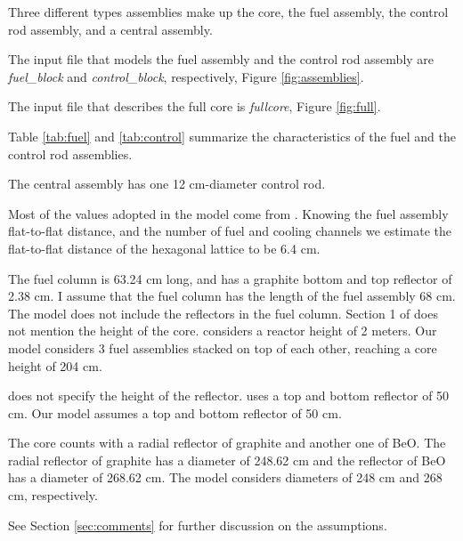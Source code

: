 \documentclass[11pt,letterpaper]{article}
\begin{document}
Three different types assemblies make up the core, the fuel assembly, the control rod assembly, and a central assembly.

The input file that models the fuel assembly and the control rod assembly are \textit{fuel\_block} and \textit{control\_block}, respectively, Figure \ref{fig:assemblies}.

The input file that describes the full core is \textit{fullcore}, Figure \ref{fig:full}.

Table \ref{tab:fuel} and \ref{tab:control} summarize the characteristics of the fuel and the control rod assemblies.

The central assembly has one 12 cm-diameter control rod.

Most of the values adopted in the model come from \cite{hawari_development_2018}.
Knowing the fuel assembly flat-to-flat distance, and the number of fuel and cooling channels we estimate the flat-to-flat distance of the hexagonal lattice to be 6.4 cm.

The fuel column is 63.24 cm long, and has a graphite bottom and top reflector of 2.38 cm.
I assume that the fuel column has the length of the fuel assembly 68 cm.
The model does not include the reflectors in the fuel column.
Section 1 of \cite{hawari_development_2018} does not mention the height of the core. 
\cite{venneri_neutronic_2015} considers a reactor height of 2 meters.
Our model considers 3 fuel assemblies stacked on top of each other, reaching a core height of 204 cm.

\cite{hawari_development_2018} does not specify the height of the reflector.
\cite{venneri_neutronic_2015} uses a top and bottom reflector of 50 cm. 
Our model assumes a top and bottom reflector of 50 cm.

The core counts with a radial reflector of graphite and another one of BeO.
The radial reflector of graphite has a diameter of 248.62 cm and the reflector of BeO has a diameter of 268.62 cm\cite{hawari_development_2018}.
The model considers diameters of 248 cm and 268 cm, respectively.

See Section \ref{sec:comments} for further discussion on the assumptions.
\end{document}
